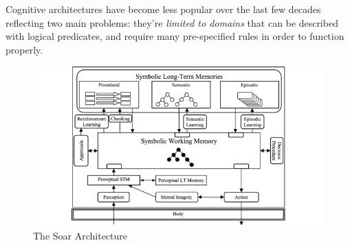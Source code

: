Cognitive architectures have become less popular over the last few decades
reflecting two main problems: they're \emph{limited to domains} that can be
described with logical predicates, and require many pre-specified rules in order
to function properly.

\begin{figure}
    \centering
    \includegraphics[width=\textwidth]{img/The-Soar-cognitive-architecture.png}
    \caption{The Soar Architecture}
    \label{fig:soar}
\end{figure}